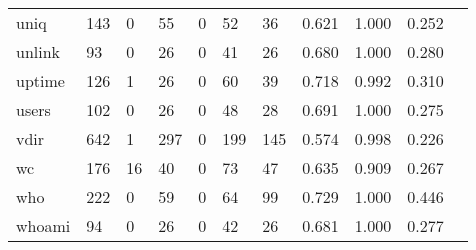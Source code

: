 \begin{longtable}{lp{1.10cm}p{1.10cm}p{1.10cm}p{1.10cm}p{1.10cm}p{1.10cm}p{1.10cm}p{1.10cm}p{1.10cm}p{1.10cm}}
uniq      &                    143 &                                  0 &                                55 &                                0 &                                52 &                              36 &                          0.621 &                                 1.000 &                               0.252 \\
unlink    &                     93 &                                  0 &                                26 &                                0 &                                41 &                              26 &                          0.680 &                                 1.000 &                               0.280 \\
uptime    &                    126 &                                  1 &                                26 &                                0 &                                60 &                              39 &                          0.718 &                                 0.992 &                               0.310 \\
users     &                    102 &                                  0 &                                26 &                                0 &                                48 &                              28 &                          0.691 &                                 1.000 &                               0.275 \\
vdir      &                    642 &                                  1 &                               297 &                                0 &                               199 &                             145 &                          0.574 &                                 0.998 &                               0.226 \\
wc        &                    176 &                                 16 &                                40 &                                0 &                                73 &                              47 &                          0.635 &                                 0.909 &                               0.267 \\
who       &                    222 &                                  0 &                                59 &                                0 &                                64 &                              99 &                          0.729 &                                 1.000 &                               0.446 \\
whoami    &                     94 &                                  0 &                                26 &                                0 &                                42 &                              26 &                          0.681 &                                 1.000 &                               0.277 \\

\end{longtable}

